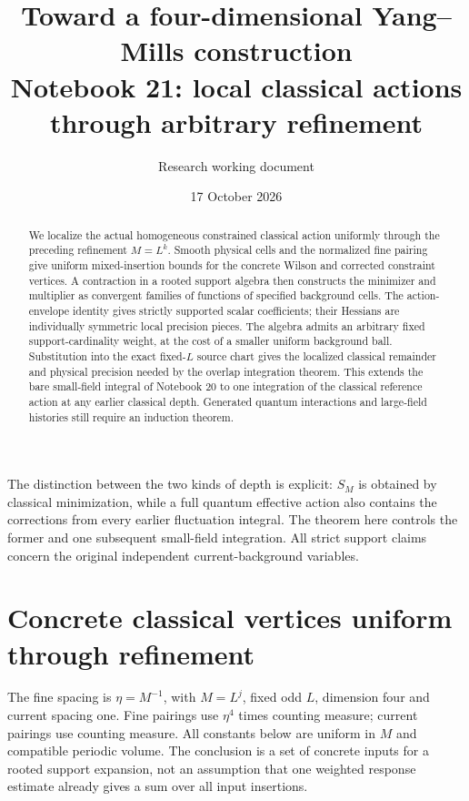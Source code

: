 \documentclass[11pt]{article}
\title{Toward a four-dimensional Yang--Mills construction\\
\large Notebook 21: local classical actions through arbitrary refinement}
\author{Research working document}
\date{17 October 2026}
\theoremstyle{remark}
\begin{document}
\maketitle
\begin{abstract}
We localize the actual homogeneous constrained classical action
uniformly through the preceding refinement $M=L^k$. Smooth
physical cells and the normalized fine pairing give uniform
mixed-insertion bounds for the concrete Wilson and corrected
constraint vertices. A contraction in a rooted support algebra
then constructs the minimizer and multiplier as convergent
families of functions of specified background cells. The
action-envelope identity gives strictly supported scalar
coefficients; their Hessians are individually symmetric local
precision pieces. The algebra admits an arbitrary fixed
support-cardinality weight, at the cost of a smaller uniform
background ball. Substitution into the exact fixed-$L$ source
chart gives the localized classical remainder and physical
precision needed by the overlap integration theorem. This
extends the bare small-field integral of Notebook 20 to one
integration of the classical reference action at any earlier
classical depth. Generated quantum interactions and large-field
histories still require an induction theorem.
\end{abstract}

The distinction between the two kinds of depth is explicit:
$S_M$ is obtained by classical minimization, while a full
quantum effective action also contains the corrections from
every earlier fluctuation integral. The theorem here controls
the former and one subsequent small-field integration. All
strict support claims concern the original independent
current-background variables.


\section{Concrete classical vertices uniform through refinement}
\label{cv-section}

The fine spacing is $\eta=M^{-1}$, with $M=L^j$, fixed odd
$L$, dimension four and current spacing one. Fine pairings
use $\eta^4$ times counting measure; current pairings use
counting measure. All constants below are uniform in $M$ and
compatible periodic volume. The conclusion is a set of concrete
inputs for a rooted support expansion, not an assumption that
one weighted response estimate already gives a sum over all
input insertions.
\end{document}
